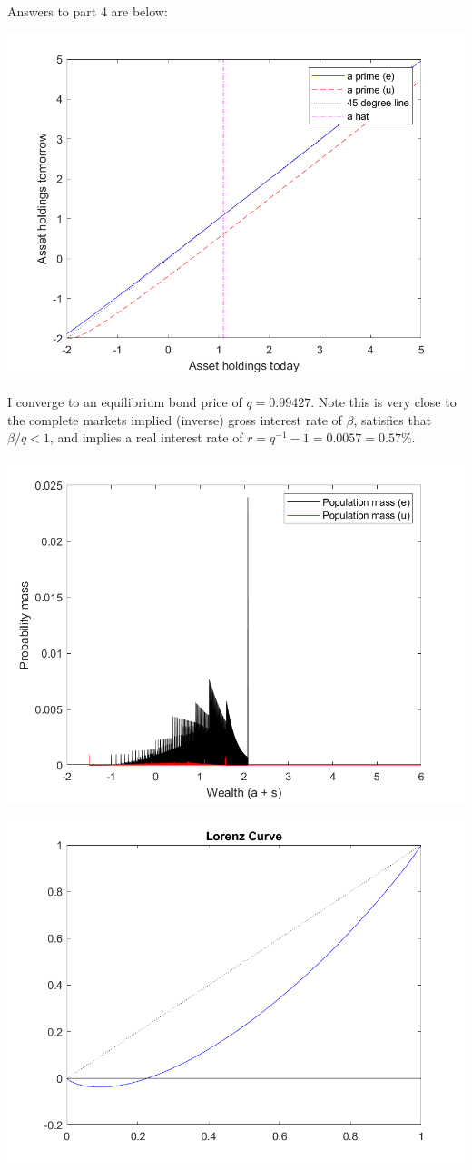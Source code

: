 \documentclass[11pt]{article} %
\begin{document}
Answers to part 4 are below:

\includegraphics{aprime}

I converge to an equilibrium bond price of $q = 0.99427$. Note this is very close to the complete markets implied (inverse) gross interest rate of $\beta$, satisfies that $\beta/q < 1$, and implies a real interest rate of $r = q^{-1} - 1 = 0.0057 = 0.57\%$. 

\includegraphics{wealth}

\includegraphics{lorenz}
\end{document}
